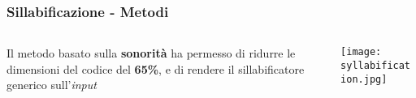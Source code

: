 \begin{frame}
  \frametitle{Sillabificazione - Metodi}
  \begin{columns}
    \begin{column}{0.4\textwidth}
      Il metodo basato sulla \textbf{sonorità} ha permesso
      di ridurre le dimensioni del codice del \textbf{65\%},
      e di rendere il sillabificatore generico sull'\textit{input}
    \end{column}
    \begin{column}{0.4\textwidth}
      \texttt{[image: syllabification.jpg]}
    \end{column}	
  \end{columns}
\end{frame}
